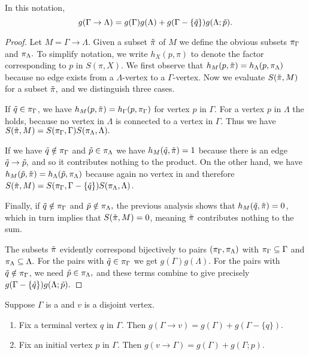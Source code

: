 \begin{prop}
	In this notation, \eqnspace \begin{equation*} g(\Gamma \rightarrow \Lambda) = g(\Gamma)g(\Lambda) + g(\Gamma - \{\tilde{q}\})g(\Lambda; \tilde{p}). \end{equation*}
\end{prop}
\begin{proof}
	Let $M = \Gamma \rightarrow \Lambda.$ Given a subset $\tilde{\pi}$ of $M$ we define the obvious subsets $\pi_\Gamma$ and $\pi_\Lambda.$ To simplify notation, we write $h_X(p, \pi)$ to denote the factor corresponding to $p$ in $S(\pi, X).$ We first observe that $h_M(p, \tilde{\pi}) = h_\Lambda(p, \pi_\Lambda)$ because no edge exists from a $\Lambda$-vertex to a $\Gamma$-vertex. Now we evaluate $S(\tilde{\pi}, M)$ for a subset $\tilde{\pi},$ and we distinguish three cases.
	
	
	If $\tilde{q} \in \pi_\Gamma$, we have $h_M(p, \tilde{\pi}) = h_\Gamma(p, \pi_\Gamma)$ for vertex $p$ in $\Gamma$. For a vertex $p$ in $\Lambda$ the holds, because no vertex in $\Lambda$ is connected to a vertex in $\Gamma$. Thus we have $S(\tilde{\pi}, M) = S(\pi_\Gamma, \Gamma)S(\pi_\Lambda, \Lambda).$
	
	If we have $\tilde{q}\notin\pi_\Gamma$ and $\tilde{p} \in \pi_\Lambda$ we have $h_M(\tilde{q}, \tilde{\pi}) = 1$ because there is an edge $\tilde{q} \rightarrow \tilde{p},$ and so it contributes nothing to the product. On the other hand, we have $h_M(\tilde{p}, \tilde{\pi}) = h_\Lambda(\tilde{p}, \pi_\Lambda)$ because again no vertex in and therefore $S(\tilde{\pi}, M) = S(\pi_\Gamma, \Gamma - \{\tilde{q}\})S(\pi_\Lambda, \Lambda)$.
	
	Finally, if $\tilde{q} \notin \pi_\Gamma$ and $\tilde{p}\notin\pi_\Lambda,$ the previous analysis shows that $h_M(\tilde{q}, \tilde{\pi}) = 0$, which in turn implies that $S(\tilde{\pi}, M) = 0$, meaning $\tilde{\pi}$ contributes nothing to the sum.
	
	The subsets $\tilde{\pi}$ evidently correspond bijectively to pairs $(\pi_\Gamma, \pi_\Lambda)$ with $\pi_\Gamma \subseteq \Gamma$ and $\pi_\Lambda \subseteq \Lambda.$ For the pairs with $\tilde{q} \in \pi_\Gamma$ we get $g(\Gamma)g(\Lambda)$. For the pairs with $\tilde{q} \notin \pi_\Gamma$, we need $\tilde{p} \in \pi_\Lambda,$ and these terms combine to give precisely $g(\Gamma - \{\tilde{q}\})g(\Lambda; \tilde{p}).$
\end{proof}

\begin{cor} Suppose $\Gamma$ is a  and $v$ is a disjoint vertex.\listspace
	\begin{enumerate} \listspace
		\item Fix a terminal vertex $q$ in $\Gamma$. Then $g(\Gamma \rightarrow v) = g(\Gamma) + g(\Gamma - \{q\}).$
		\item Fix an initial vertex $p$ in $\Gamma.$ Then $g(v \rightarrow \Gamma) = g(\Gamma) + g(\Gamma; p).$
	\end{enumerate}\textspace
\end{cor}

